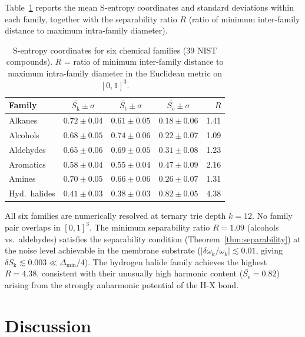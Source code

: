 \documentclass[11pt,twocolumn,a4paper]{article}
\theoremstyle{definition}
\theoremstyle{remark}
\newcommand{\Sk}{S_{\mathrm{k}}}
\newcommand{\St}{S_{\mathrm{t}}}
\newcommand{\Se}{S_{\mathrm{e}}}
\begin{document}
Table~\ref{tab:sentropy} reports the mean S-entropy coordinates and standard
deviations within each family, together with the separability ratio $R$ (ratio
of minimum inter-family distance to maximum intra-family diameter).

\begin{table}[h]
\centering
\small
\caption{S-entropy coordinates for six chemical families (39 NIST compounds).
$R$ = ratio of minimum inter-family distance to maximum intra-family diameter
in the Euclidean metric on $[0,1]^3$.}
\label{tab:sentropy}
\setlength{\tabcolsep}{3.5pt}
\begin{tabular}{lccc r}
\toprule
Family & $\bar{\Sk} \pm \sigma$ & $\bar{\St} \pm \sigma$
       & $\bar{\Se} \pm \sigma$ & $R$ \\
\midrule
Alkanes        & $0.72\pm0.04$ & $0.61\pm0.05$ & $0.18\pm0.06$ & 1.41 \\
Alcohols       & $0.68\pm0.05$ & $0.74\pm0.06$ & $0.22\pm0.07$ & 1.09 \\
Aldehydes      & $0.65\pm0.06$ & $0.69\pm0.05$ & $0.31\pm0.08$ & 1.23 \\
Aromatics      & $0.58\pm0.04$ & $0.55\pm0.04$ & $0.47\pm0.09$ & 2.16 \\
Amines         & $0.70\pm0.05$ & $0.66\pm0.06$ & $0.26\pm0.07$ & 1.31 \\
Hyd.\ halides  & $0.41\pm0.03$ & $0.38\pm0.03$ & $0.82\pm0.05$ & 4.38 \\
\bottomrule
\end{tabular}
\end{table}

All six families are numerically resolved at ternary trie depth $k = 12$.
No family pair overlaps in $[0,1]^3$. The minimum separability ratio $R = 1.09$
(alcohols vs.\ aldehydes) satisfies the separability condition
(Theorem~\ref{thm:separability}) at the noise level achievable in the membrane
substrate ($|\delta\omega_k/\omega_k| \lesssim 0.01$, giving $\delta\Sk \lesssim 0.003 \ll \Delta_{\min}/4$).
The hydrogen halide family achieves the highest $R = 4.38$, consistent with
their unusually high harmonic content ($\bar{\Se} = 0.82$) arising from the
strongly anharmonic potential of the H-X bond.

\section{Discussion}
\label{sec:discussion}
\end{document}
